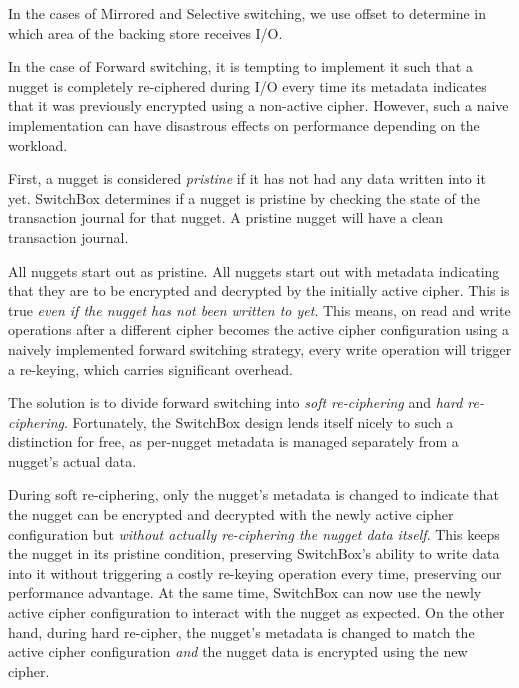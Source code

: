 In the cases of Mirrored and Selective switching, we use offset to determine in
which area of the backing store receives I/O.

In the case of Forward switching, it is tempting to implement it such that a
nugget is completely re-ciphered during I/O every time its metadata indicates
that it was previously encrypted using a non-active cipher. However, such a
naive implementation can have disastrous effects on performance depending on the
workload.

First, a nugget is considered \emph{pristine} if it has not had any data written
into it yet. SwitchBox determines if a nugget is pristine by checking the state
of the transaction journal for that nugget. A pristine nugget will have a clean
transaction journal.

All nuggets start out as pristine. All nuggets start out with metadata
indicating that they are to be encrypted and decrypted by the initially active
cipher. This is true \emph{even if the nugget has not been written to yet}. This
means, on read and write operations after a different cipher becomes the active
cipher configuration using a naively implemented forward switching strategy,
every write operation will trigger a re-keying, which carries significant
overhead.

The solution is to divide forward switching into \emph{soft re-ciphering} and
\emph{hard re-ciphering}. Fortunately, the SwitchBox design lends itself nicely
to such a distinction for free, as per-nugget metadata is managed separately
from a nugget's actual data.

During soft re-ciphering, only the nugget's metadata is changed to indicate that
the nugget can be encrypted and decrypted with the newly active cipher
configuration but \emph{without actually re-ciphering the nugget data itself}.
This keeps the nugget in its pristine condition, preserving SwitchBox's ability
to write data into it without triggering a costly re-keying operation every
time, preserving our performance advantage. At the same time, SwitchBox can now
use the newly active cipher configuration to interact with the nugget as
expected. On the other hand, during hard re-cipher, the nugget's metadata is
changed to match the active cipher configuration \emph{and} the nugget data is
encrypted using the new cipher.


